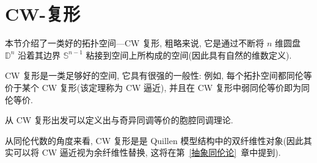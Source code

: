 \chapter{CW-复形}
\begin{introduction}
    \item 本节介绍了一类好的拓扑空间---CW 复形, 粗略来说, 它是通过不断将 $n$ 维圆盘 $\mathbb{D}^n$ 沿着其边界 $\mathbb{S}^{n-1}$ 粘接到空间上所构成的空间(因此具有自然的维数定义).
    \item CW 复形是一类足够好的空间, 它具有很强的一般性: 例如, 每个拓扑空间都同伦等价于某个 CW 复形(该定理称为 CW 逼近), 并且在 CW 复形中弱同伦等价即为同伦等价.
    \item 从 CW 复形出发可以定义出与奇异同调等价的胞腔同调理论.
    \item 从同伦代数的角度来看, CW 复形是是 Quillen 模型结构中的双纤维性对象(因此其实可以将 CW 逼近视为余纤维性替换, 这将在第~\ref{抽象同伦论}~章中提到).
\end{introduction}
